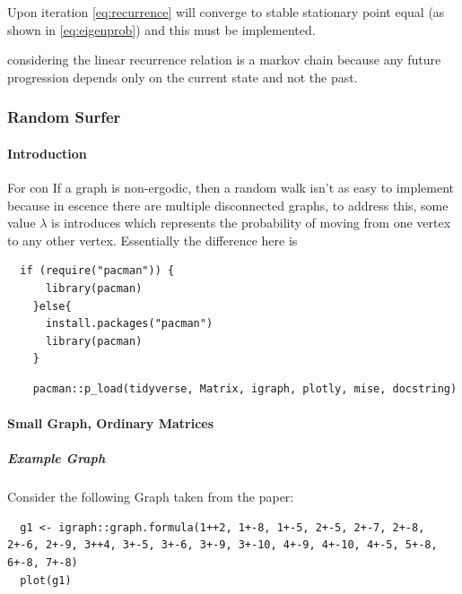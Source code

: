 \documentclass[11pt]{article}
\begin{document}
Upon iteration \eqref{eq:recurrence} will converge to stable stationary point equal (as shown in \eqref{eq:eigenprob}) and this must be implemented.



considering the linear recurrence relation is a markov chain because any future progression depends only on the current state and not the past.

\subsubsection{Random Surfer}
\label{sec:orgc85ff27}
\paragraph{Introduction}
\label{sec:org6a55482}
For con If a graph is non-ergodic, then a random walk isn't as easy to implement
because in escence there are multiple disconnected graphs, to address this, some
value \(\lambda\) is introduces which represents the probability of moving from
one vertex to any other vertex. Essentially the difference here is

\begin{verbatim}
  if (require("pacman")) {
      library(pacman)
    }else{
      install.packages("pacman")
      library(pacman)
    }
\end{verbatim}

\begin{verbatim}
    pacman::p_load(tidyverse, Matrix, igraph, plotly, mise, docstring)
\end{verbatim}

\paragraph{Small Graph, Ordinary Matrices}
\label{implementing-page-rank-methods}
\subparagraph{Example Graph}
\label{example-graph}
Consider the following Graph taken from the paper:

\begin{verbatim}
  g1 <- igraph::graph.formula(1++2, 1+-8, 1+-5, 2+-5, 2+-7, 2+-8, 2+-6, 2+-9, 3++4, 3+-5, 3+-6, 3+-9, 3+-10, 4+-9, 4+-10, 4+-5, 5+-8, 6+-8, 7+-8)
  plot(g1)
\end{verbatim}
\end{document}
